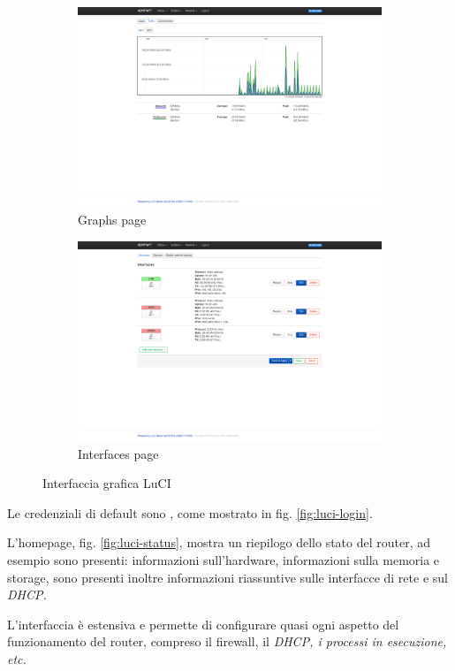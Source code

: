 \begin{figure}[H]
    \begin{subfigure}{0.5\textwidth}
        \centering
        \includegraphics[height=0.65\linewidth]{immagini/LuCI_graphs}
        \caption{Graphs page}
        \label{fig:luci-graphs}
    \end{subfigure}%
    \hfill
    \begin{subfigure}{0.5\textwidth}
        \centering
        \includegraphics[height=0.65\linewidth]{immagini/LuCI_interfaces}
        \caption{Interfaces page}
        \label{fig:luci-interfaces}
    \end{subfigure}%
    \caption{Interfaccia grafica LuCI}
\end{figure}

Le credenziali di default sono  , come mostrato in fig. \ref{fig:luci-login}.

L'homepage, fig. \ref{fig:luci-status}, mostra un riepilogo dello stato del router, ad esempio sono presenti: informazioni sull'hardware, informazioni sulla memoria e storage, sono presenti inoltre informazioni riassuntive sulle interfacce di rete e sul \it{DHCP}.

L'interfaccia è estensiva e permette di configurare quasi ogni aspetto del funzionamento del router, compreso il firewall, il \it{DHCP}, i processi in esecuzione, etc. 




